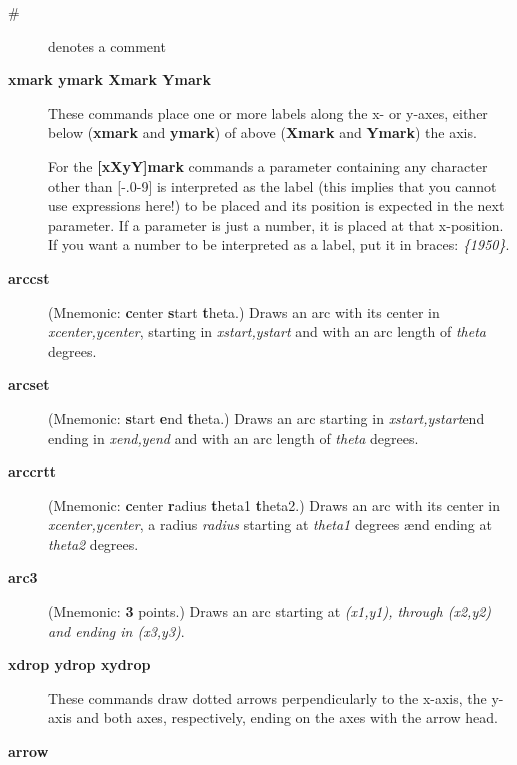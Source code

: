 \documentclass[a4paper,twocolumn]{article}
\begin{document}
\begin{description}
\item[{\#}] 

denotes a comment

\item[{\textbf{xmark ymark Xmark Ymark}}] 

These commands place one or more labels along the x- or y-axes, either
below (\textbf{xmark} and \textbf{ymark}) of above (\textbf{Xmark} and \textbf{Ymark}) the axis.

For the \textbf{[xXyY]mark} commands a parameter containing any character
other than [-.0-9] is interpreted as the label (this implies that you
cannot use expressions here!) to be placed and its position is expected
in the next parameter. If a parameter is just a number, it is placed at
that x-position. If you want a number to be interpreted as a label, put
it in braces: \textit{\{1950\}}.

\item[{\textbf{arccst}}] 

(Mnemonic: \textbf{c}enter \textbf{s}tart \textbf{t}heta.)
Draws an arc with its center in \textit{xcenter,ycenter}, starting in \textit{xstart,ystart}
and with an arc length of \textit{theta} degrees.

\item[{\textbf{arcset}}] 

(Mnemonic: \textbf{s}tart \textbf{e}nd \textbf{t}heta.)
Draws an arc starting in \textit{xstart,ystart}end ending in \textit{xend,yend}
and with an arc length of \textit{theta} degrees.

\item[{\textbf{arccrtt}}] 

(Mnemonic: \textbf{c}enter \textbf{r}adius \textbf{t}heta1 \textbf{t}heta2.)
Draws an arc with its center in \textit{xcenter,ycenter}, a radius \textit{radius}
starting at \textit{theta1} degrees ænd ending at \textit{theta2} degrees.

\item[{\textbf{arc3}}] 

(Mnemonic: \textbf{3} points.)
Draws an arc starting at \textit{(x1,y1), through (x2,y2) and ending in (x3,y3)}.

\item[{\textbf{xdrop ydrop xydrop}}] 

These commands draw dotted arrows perpendicularly to the x-axis, the
y-axis and both axes, respectively, ending on the axes with the
arrow head.

\item[{\textbf{arrow}}] 


\end{description}
\end{document}
